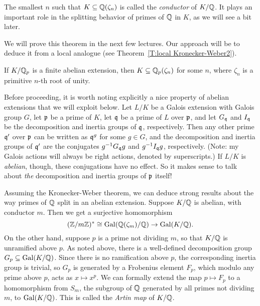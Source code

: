 The smallest $n$ such that $K \subseteq \mathbb{Q}(\zeta_n)$ is called the
\emph{conductor} of $K/\mathbb{Q}$. It plays an important role in the splitting
behavior of primes of $\mathbb{Q}$ in $K$, as we will see a bit later.

We will prove this theorem in the next few lectures. Our approach will be to
deduce it from a local analogue (see Theorem~\ref{T:local Kronecker-Weber2}).
\begin{theorem} \label{T:local Kronecker-Weber1}
If $K/\mathbb{Q}_p$ is a finite abelian extension, then
$K \subseteq \mathbb{Q}_p(\zeta_n)$ for some $n$, where $\zeta_n$
is a primitive $n$-th root of unity.
\end{theorem}

Before proceeding, it is worth noting explicitly a nice property of
abelian extensions that we will exploit below. Let $L/K$ be a Galois
extension with Galois group $G$, let $\mathfrak{p}$ be a prime of $K$,
let $\mathfrak{q}$ be a prime of $L$ over $\mathfrak{p}$, and let $G_{\mathfrak{q}}$ and
$I_{\mathfrak{q}}$ be the decomposition and inertia groups of $\mathfrak{q}$,
respectively. Then any other prime $\mathfrak{q}'$ over $\mathfrak{p}$ can be written
as $\mathfrak{q}^g$ for some $g \in G$, and the decomposition and inertia groups
of $\mathfrak{q}'$ are the conjugates $g^{-1} G_{\mathfrak{q}} g$ and $g^{-1} I_{\mathfrak{q}}
g$, respectively. (Note: my Galois actions will always be right actions,
denoted by superscripts.) If $L/K$ is \emph{abelian}, though, these
conjugations have no effect. So it makes sense to talk about \emph{the}
decomposition and inertia groups of $\mathfrak{p}$ itself!


Assuming the Kronecker-Weber theorem, we can deduce strong results
about the way primes of $\mathbb{Q}$ split in an abelian extension. Suppose
$K/\mathbb{Q}$ is abelian, with conductor $m$. Then we get a surjective homomorphism
\[
(\mathbb{Z}/m\mathbb{Z})^* \cong \operatorname{Gal}(\mathbb{Q}(\zeta_m)/\mathbb{Q}) \to \operatorname{Gal}(K/\mathbb{Q}).
\]
On the other hand, suppose $p$ is a prime not dividing $m$, so that
$K/\mathbb{Q}$ is unramified above $p$. As noted above, there is a well-defined
decomposition group $G_p \subseteq \operatorname{Gal}(K/\mathbb{Q})$. Since there is no ramification
above $p$, the corresponding inertia group is trivial, so $G_p$ is generated
by a Frobenius element $F_p$, which modulo any prime above $p$,
acts as $x \mapsto x^p$. We can formally extend the map $p \mapsto F_p$
to a homomorphism from
$S_m$, the subgroup of $\mathbb{Q}$ generated by all primes not dividing $m$,
to $\operatorname{Gal}(K/\mathbb{Q})$. This is called the \emph{Artin map} of $K/\mathbb{Q}$.

